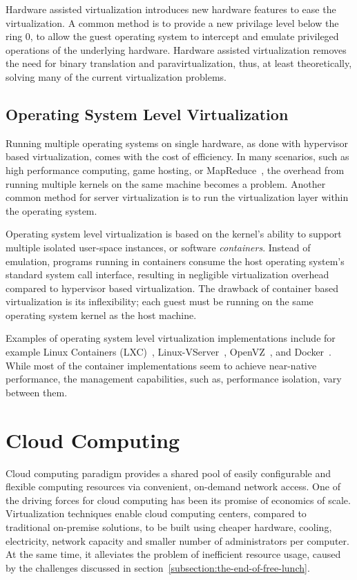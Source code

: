 Hardware assisted virtualization introduces new hardware features to ease the virtualization. A common method is to provide a new privilage level below the ring 0, to allow the guest operating system to intercept and emulate privileged operations of the underlying hardware. Hardware assisted virtualization removes the need for binary translation and paravirtualization, thus, at least theoretically, solving many of the current virtualization problems.~\cite{Horne:2007:Understanding, Pearce:2013:VIS}

\subsection{Operating System Level Virtualization}
Running multiple operating systems on single hardware, as done with hypervisor based virtualization, comes with the cost of efficiency. In many scenarios, such as high performance computing, game hosting, or MapReduce~\cite{Dean:2008:MR}, the overhead from running multiple kernels on the same machine becomes a problem. Another common method for server virtualization is to run the virtualization layer within the operating system.~\cite{Soltesz:2007:COS, Xavier:2014:Containers}

Operating system level virtualization is based on the kernel's ability to support multiple isolated user-space instances, or software \emph{containers}. Instead of emulation, programs running in containers consume the host operating system's standard system call interface, resulting in negligible virtualization overhead compared to hypervisor based virtualization. The drawback of container based virtualization is its inflexibility; each guest must be running on the same operating system kernel as the host machine.~\cite{Soltesz:2007:COS, Xavier:2014:Containers}

Examples of operating system level virtualization implementations include for example Linux Containers (LXC)~\cite{LinuxContainers:2013:LXC}, Linux-VServer~\cite{Des:2005:Virtualization}, OpenVZ~\cite{OpenVZ:2013}, and Docker~\cite{Merkel:2014:Docker}. While most of the container implementations seem to achieve near-native performance, the management capabilities, such as, performance isolation, vary between them.

\section{Cloud Computing}
Cloud computing paradigm provides a shared pool of easily configurable and flexible computing resources via convenient, on-demand network access. One of the driving forces for cloud computing has been its promise of economics of scale. Virtualization techniques enable cloud computing centers, compared to traditional on-premise solutions, to be built using cheaper hardware, cooling, electricity, network capacity and smaller number of administrators per computer. At the same time, it alleviates the problem of inefficient resource usage, caused by the challenges discussed in section~\ref{subsection:the-end-of-free-lunch}.~\cite{Mell:2011:ccdef}

